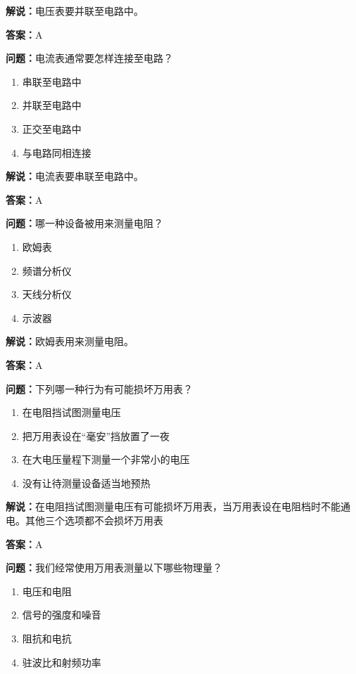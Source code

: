 \textbf{解说：}电压表要并联至电路中。%

\textbf{答案：}A

\textbf{问题：}电流表通常要怎样连接至电路？

\begin{enumerate}[label=\Alph*), leftmargin=3em]
	\item 串联至电路中
	\item 并联至电路中
	\item 正交至电路中
	\item 与电路同相连接
\end{enumerate}

\textbf{解说：}电流表要串联至电路中。%

\textbf{答案：}A

\textbf{问题：}哪一种设备被用来测量电阻？

\begin{enumerate}[label=\Alph*), leftmargin=3em]
	\item 欧姆表
	\item 频谱分析仪
	\item 天线分析仪
	\item 示波器
\end{enumerate}

\textbf{解说：}欧姆表用来测量电阻。

\textbf{答案：}A

\textbf{问题：}下列哪一种行为有可能损坏万用表？

\begin{enumerate}[label=\Alph*), leftmargin=3em]
	\item 在电阻挡试图测量电压
	\item 把万用表设在“毫安”挡放置了一夜
	\item 在大电压量程下测量一个非常小的电压
	\item 没有让待测量设备适当地预热
\end{enumerate}

\textbf{解说：}在电阻挡试图测量电压有可能损坏万用表，当万用表设在电阻档时不能通电。其他三个选项都不会损坏万用表%

\textbf{答案：}A

\textbf{问题：}我们经常使用万用表测量以下哪些物理量？

\begin{enumerate}[label=\Alph*), leftmargin=3em]
	\item 电压和电阻
	\item 信号的强度和噪音
	\item 阻抗和电抗
	\item 驻波比和射频功率
\end{enumerate}

